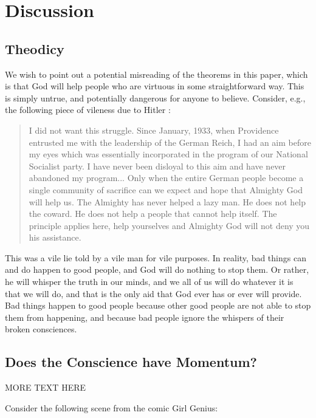 \documentclass{article}
\begin{document}
\section{Discussion}

\subsection{Theodicy}

We wish to point out a potential misreading of the theorems in this
paper, which is that God will help people who are virtuous in some
straightforward way. This is simply untrue, and potentially dangerous
for anyone to believe. Consider, e.g., the following piece of vileness
due to Hitler \cite{hitler}:
\begin{quote}
I did not want this struggle. Since January, 1933, when Providence
entrusted me with the leadership of the German Reich, I had an aim
before my eyes which was essentially incorporated in the program of
our National Socialist party. I have never been disloyal to this aim
and have never abandoned my program... Only when the entire German
people become a single community of sacrifice can we expect and hope
that Almighty God will help us. The Almighty has never helped a lazy
man. He does not help the coward. He does not help a people that
cannot help itself. The principle applies here, help yourselves and
Almighty God will not deny you his assistance.
\end{quote}

This was a vile lie told by a vile man for vile purposes. In reality,
bad things can and do happen to good people, and God will do nothing
to stop them. Or rather, he will whisper the truth in our minds, and
we all of us will do whatever it is that we will do, and that is the
only aid that God ever has or ever will provide. Bad things happen to
good people because other good people are not able to stop them from
happening, and because bad people ignore the whispers of their broken
consciences.

\subsection{Does the Conscience have Momentum?}

MORE TEXT HERE

Consider the following scene from the comic Girl Genius\cite{jagers}:
\end{document}
